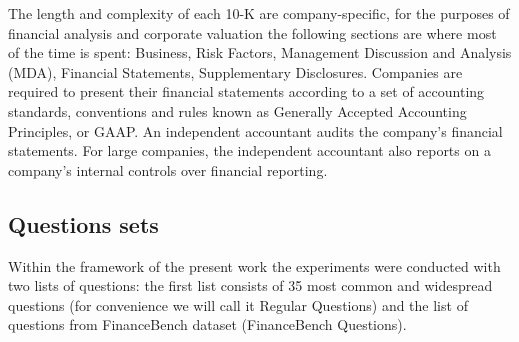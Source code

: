 The length and complexity of each 10-K are company-specific, for the purposes of financial analysis and corporate valuation the following sections are where most of the time is spent: Business, Risk Factors, Management Discussion and Analysis (MDA), Financial Statements, Supplementary Disclosures. Companies are required to present their financial statements according to a set of accounting standards, conventions and rules known as Generally Accepted Accounting Principles, or GAAP. An independent accountant audits the company’s financial statements. For large companies, the independent accountant also reports on a company’s internal controls over financial reporting.


\subsection{Questions sets}
Within the framework of the present work the experiments were conducted with two lists of questions: the first list consists of 35 most common and widespread questions (for convenience we will call it Regular Questions) and the list of questions from FinanceBench dataset (FinanceBench Questions).

